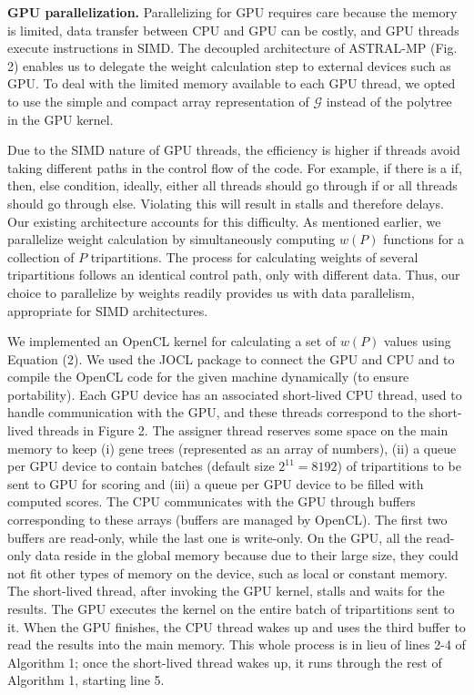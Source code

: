 \documentclass[12pt]{article}
\begin{document}
\textbf{GPU parallelization.} Parallelizing for GPU requires care because the memory is limited, data transfer between CPU and GPU can be costly, and GPU threads execute instructions in SIMD. The decoupled architecture of ASTRAL-MP (Fig. 2) enables us to delegate the weight calculation step to external devices such as GPU. To deal with the limited memory available to each GPU thread, we opted to use the simple and compact array representation of $\mathcal{G}$ instead of the polytree in the GPU kernel.

Due to the SIMD nature of GPU threads, the efficiency is higher if threads avoid taking different paths in the control flow of the code. For example, if there is a if, then, else condition, ideally, either all threads should go through if or all threads should go through else. Violating this will result in stalls and therefore delays. Our existing architecture accounts for this difficulty. As mentioned earlier, we parallelize weight calculation by simultaneously computing $w(P)$ functions for a collection of $P$ tripartitions. The process for calculating weights of several tripartitions follows an identical control path, only with different data. Thus, our choice to parallelize by weights readily provides us with data parallelism, appropriate for SIMD architectures.

We implemented an OpenCL kernel for calculating a set of $w(P)$ values using Equation (2). We used the JOCL package to connect the GPU and CPU and to compile the OpenCL code for the given machine dynamically (to ensure portability). Each GPU device has an associated short-lived CPU thread, used to handle communication with the GPU, and these threads correspond to the short-lived threads in Figure 2. The assigner thread reserves some space on the main memory to keep (i) gene trees (represented as an array of numbers), (ii) a queue per GPU device to contain batches (default size $2^{11}=8192$) of tripartitions to be sent to GPU for scoring and (iii) a queue per GPU device to be filled with computed scores. The CPU communicates with the GPU through buffers corresponding to these arrays (buffers are managed by OpenCL). The first two buffers are read-only, while the last one is write-only. On the GPU, all the read-only data reside in the global memory because due to their large size, they could not fit other types of memory on the device, such as local or constant memory. The short-lived thread, after invoking the GPU kernel, stalls and waits for the results. The GPU executes the kernel on the entire batch of tripartitions sent to it. When the GPU finishes, the CPU thread wakes up and uses the third buffer to read the results into the main memory. This whole process is in lieu of lines 2-4 of Algorithm 1; once the short-lived thread wakes up, it runs through the rest of Algorithm 1, starting line 5.
\end{document}
